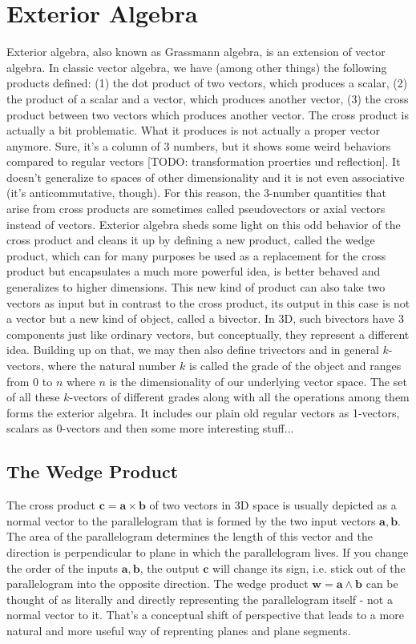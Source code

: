 \section{Exterior Algebra}
Exterior algebra, also known as Grassmann algebra, is an extension of vector algebra. In classic vector algebra, we have (among other things) the following products defined: (1) the dot product of two vectors, which produces a scalar, (2) the product of a scalar and a vector, which produces another vector, (3) the cross product between two vectors which produces another vector. The cross product is actually a bit problematic. What it produces is not actually a proper vector anymore. Sure, it's a column of 3 numbers, but it shows some weird behaviors compared to regular vectors [TODO: transformation proerties und reflection]. It doesn't generalize to spaces of other dimensionality and it is not even associative (it's anticommutative, though). For this reason, the 3-number quantities that arise from cross products are sometimes called pseudovectors or axial vectors instead of vectors. Exterior algebra sheds some light on this odd behavior of the cross product and cleans it up by defining a new product, called the wedge product, which can for many purposes be used as a replacement for the cross product but encapsulates a much more powerful idea, is better behaved and generalizes to higher dimensions. This new kind of product can also take two vectors as input but in contrast to the cross product, its output in this case is not a vector but a new kind of object, called a bivector. In 3D, such bivectors have 3 components just like ordinary vectors, but conceptually, they represent a different idea. Building up on that, we may then also define trivectors and in general $k$-vectors, where the natural number $k$ is called the grade of the object and ranges from $0$ to $n$ where $n$ is the dimensionality of our underlying vector space. The set of all these $k$-vectors of different grades along with all the operations among them forms the exterior algebra. It includes our plain old regular vectors as 1-vectors, scalars as 0-vectors and then some more interesting stuff...

\subsection{The Wedge Product}
The cross product $\mathbf{c = a \times b}$ of two vectors in 3D space is usually depicted as a normal vector to the parallelogram that is formed by the two input vectors $\mathbf{a,b}$. The area of the parallelogram determines the length of this vector and the direction is perpendicular to plane in which the parallelogram lives. If you change the order of the inputs $\mathbf{a,b}$, the output  $\mathbf{c}$ will change its sign, i.e. stick out of the parallelogram into the opposite direction. The wedge product $\mathbf{w = a \wedge b}$ can be thought of as literally and directly representing the parallelogram itself - not a normal vector to it. That's a conceptual shift of perspective that leads to a more natural and more useful way of reprenting planes and plane segments.

